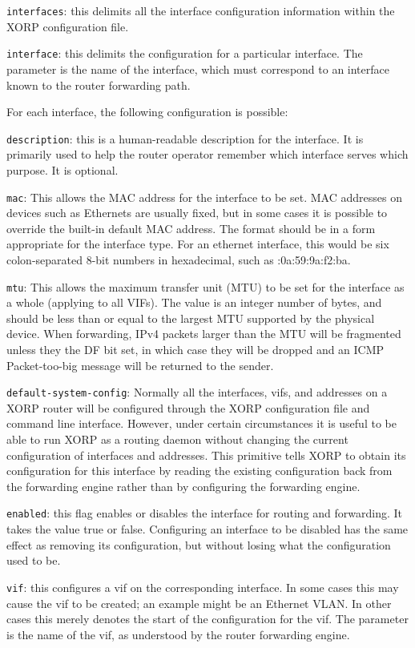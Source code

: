 \begin{description}
\item{\tt interfaces}: this delimits all the interface configuration information within the XORP configuration file.
\item{\tt interface}: this delimits the configuration for a particular
  interface.  The parameter is the name of the interface, which must
  correspond to an interface known to the router forwarding path.

  For each interface, the following configuration is possible:
\begin{description}
\item{\tt description}: this is a human-readable description for the
  interface.  It is primarily used to help the router operator
  remember which interface serves which purpose.  It is optional.
\item{\tt mac}: This allows the MAC address for the interface to be
  set.  MAC addresses on devices such as Ethernets are usually fixed,
  but in some cases it is possible to override the built-in default
  MAC address.  The format should be in a form appropriate for the
  interface type.  For an ethernet interface, this would be six
  colon-separated 8-bit numbers in hexadecimal, such as
  {:0a:59:9a:f2:ba}.
\item{\tt mtu}: This allows the maximum transfer unit (MTU) to be set
  for the interface as a whole (applying to all VIFs).  The value is
  an integer number of bytes, and should be less than or equal to the
  largest MTU supported by the physical device. When forwarding, IPv4
  packets larger than the MTU will be fragmented unless they the DF
  bit set, in which case they will be dropped and an ICMP
  Packet-too-big message will be returned to the sender.
\item{\tt default-system-config}: Normally all the interfaces, vifs,
  and addresses on a XORP router will be configured through the XORP
  configuration file and command line interface.  However, under
  certain circumstances it is useful to be able to run XORP as a
  routing daemon without changing the current configuration of
  interfaces and addresses.  This primitive tells XORP to obtain its
  configuration for this interface by reading the existing
  configuration back from the forwarding engine rather than by
  configuring the forwarding engine.
\item{\tt enabled}: this flag enables or disables the interface for
  routing and forwarding.  It takes the value {\stt true} or {\stt
  false}.  Configuring an interface to be disabled has the same effect
  as removing its configuration, but without losing what the
  configuration used to be.
\item{\tt vif}: this configures a vif on the corresponding interface.
  In some cases this may cause the vif to be created; an example
  might be an Ethernet VLAN.  In other cases this merely denotes the
  start of the configuration for the vif.  The parameter is the name
  of the vif, as understood by the router forwarding engine.


\end{description}
\end{description}
